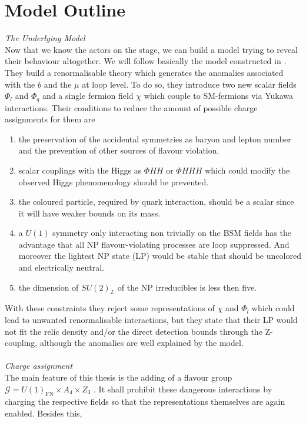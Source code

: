 


\section{Model Outline}
\textit{The Underlying Model}\\
\noindent Now that we know the actors on the stage, we can build a model trying to reveal their behaviour altogether. We will follow basically the model constructed
in \cite{Grip}. They build a renormalisable theory which generates the anomalies associated with the $b$ and the $\mu$ at loop level. To do so, they 
introduce two new scalar fields $\Phi_l$ and $\Phi_q$ and a single fermion field $\chi$ which couple to SM-fermions via Yukawa interactions. 
Their conditions to reduce the amount of possible charge assignments for them are 
\begin{enumerate}
 \item the preservation of the accidental symmetries as baryon and lepton number and the prevention of other sources of flavour violation.
 \item scalar couplings with the Higgs as $\Phi H H$ or $\Phi H H H$ which could modify the observed Higgs phenomenology should be prevented.
 \item the coloured particle, required by quark interaction, should be a scalar since it will have weaker bounds on its mass.
 \item a $U(1)$ symmetry only interacting non trivially on the BSM fields has the advantage that all NP flavour-violating processes are loop suppressed. And
 moreover the lightest NP state (LP) would be stable that should be uncolored and electrically neutral. 
 \item the dimension of $SU(2)_L$ of the NP irreducibles is less then five.
\end{enumerate}
With these constraints they reject some representations of $\chi$ and $\Phi_l$ which could lead to unwanted renormalisable interactions, but they state 
that their LP would not fit the relic density and/or the direct detection bounds through the Z-coupling, although the anomalies are 
well explained by the model. \\ \\
\noindent \textit{Charge assignment}\\ \noindent
The main feature of this thesis is the adding of a flavour group $\mathcal{G} = U(1)_\text{FN}\times A_4 \times Z_3$ \cite{FerA4}\cite{VarzTotMod}. 
It shall prohibit these dangerous interactions by charging the respective fields so that the representations themselves are again enabled. Besides this,
